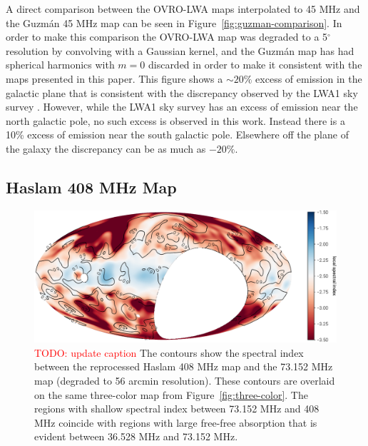 \documentclass[twocolumn]{aastex61}
\newcommand{\todo}[1]{\textcolor{red}{TODO: #1}\PackageWarning{TODO:}{#1!}}
\begin{document}
A direct comparison between the OVRO-LWA maps interpolated to 45 MHz and the Guzm\'{a}n 45 MHz map
\citep{2011A&A...525A.138G} can be seen in Figure~\ref{fig:guzman-comparison}. In order to make this
comparison the OVRO-LWA map was degraded to a 5$^\circ$ resolution by convolving with a Gaussian
kernel, and the Guzm\'{a}n map has had spherical harmonics with $m=0$ discarded in order to make it
consistent with the maps presented in this paper. This figure shows a $\sim20\%$ excess of emission
in the galactic plane that is consistent with the discrepancy observed by the LWA1 sky survey
\citep{2017MNRAS.469.4537D}. However, while the LWA1 sky survey has an excess of emission near the
north galactic pole, no such excess is observed in this work. Instead there is a 10\% excess of
emission near the south galactic pole. Elsewhere off the plane of the galaxy the discrepancy can be
as much as $-20\%$.

\subsection{Haslam 408 MHz Map}

\begin{figure}[t]
    \centering
    \includegraphics[height=0.32\textheight]{figures/haslam/better-haslam-spectral-index}
    \caption{
        \todo{update caption}
        The contours show the spectral index between the reprocessed Haslam 408 MHz map and the
        73.152 MHz map (degraded to 56 arcmin resolution). These contours are overlaid on the same
        three-color map from Figure~\ref{fig:three-color}. The regions with shallow spectral index
        between 73.152 MHz and 408 MHz coincide with regions with large free-free absorption that is
        evident between 36.528 MHz and 73.152 MHz.
    }
    \label{fig:haslam-spectral-index}
\end{figure}
\end{document}
